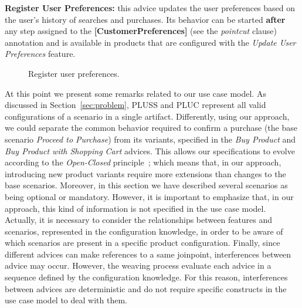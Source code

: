 \documentclass{acm_proc_article-sp}
\begin{document}
{\bf Register User Preferences:} this advice updates the user preferences based
on the user's history of searches and purchases. Its behavior can be started {\bf
after} any step assigned to the {\bf [CustomerPreferences]} (see the
\emph{pointcut} clause) annotation and is available in products that are
configured with the \emph{Update User Preferences} feature.

\begin{figure}[h]
\caption{Register user preferences.}
\label{fig:register-preferences-flow}
\end{figure}

{\color{red} At this point we present some remarks related to our use case model. As discussed in Section~\ref{sec:problem}, PLUSS and PLUC represent all valid
configurations of a scenario in a single artifact. Differently, using our approach, we could separate the common behavior required to confirm a purchase (the base
scenario \emph{Proceed to Purchase}) from its variants, specified in the
\emph{Buy Product} and \emph{Buy Product with Shopping Cart} advices. This allows
our specifications to evolve according to the \emph{Open-Closed}
principle~\cite{Meyer:2000aa}; which means that, in our approach, introducing new product variants require more extensions than changes to the base scenarios.
Moreover, in this section we have described several scenarios as being optional or
mandatory. However, it is important to emphasize that, in our approach, this kind of
information is not specified in the use case model. Actually, it is necessary to
consider the relationships between features and scenarios, represented in the configuration knowledge, in order to be
aware of which scenarios are present in a specific product configuration. Finally, since different advices can make references to a same joinpoint,  interferences between advice may occur. However, the weaving process evaluate each advice in a sequence defined by the configuration knowledge. For this reason, interferences between advices are deterministic and do not require specific constructs in the use case model to deal with them.}    
\end{document}
